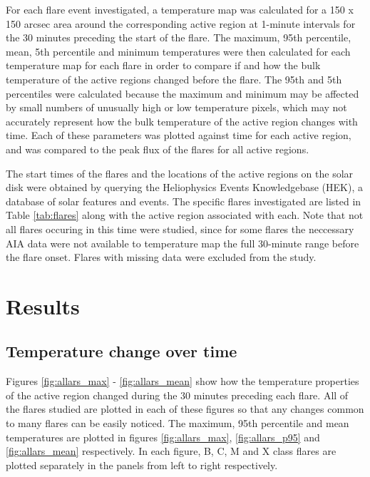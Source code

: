 \documentclass[referee,a4paper,12pt]{swsc}
\begin{document}
\begin{linenumbers}
For each flare event investigated, a temperature map was calculated for a 150 x 150 arcsec area around the corresponding active region at 1-minute intervals for the 30 minutes preceding the start of the flare.
The maximum, 95th percentile, mean, 5th percentile and minimum temperatures were then calculated for each temperature map for each flare in order to compare if and how the bulk temperature of the active regions changed before the flare.
The 95th and 5th percentiles were calculated because the maximum and minimum may be affected by small numbers of unusually high or low temperature pixels, which may not accurately represent how the bulk temperature of the active region changes with time. %
Each of these parameters was plotted against time for each active region, and was compared to the peak flux of the flares for all active regions.

The start times of the flares and the locations of the active regions on the solar disk were obtained by querying the Heliophysics Events Knowledgebase (HEK), a database of solar features and events. %
The specific flares investigated are listed in Table \ref{tab:flares} along with the active region associated with each.
Note that not all flares occuring in this time were studied, since for some flares the neccessary AIA data were not available to temperature map the full 30-minute range before the flare onset.
Flares with missing data were excluded from the study.

\section{Results}
\subsection{Temperature change over time} \label{sec:temps_v_time}
Figures \ref{fig:allars_max} - \ref{fig:allars_mean} show how the temperature properties of the active region changed during the 30 minutes preceding each flare.
All of the flares studied are plotted in each of these figures so that any changes common to many flares can be easily noticed.
The maximum, 95th percentile and mean temperatures are plotted in figures \ref{fig:allars_max}, \ref{fig:allars_p95} and \ref{fig:allars_mean} respectively.
In each figure, B, C, M and X class flares are plotted separately in the panels from left to right respectively.


\end{linenumbers}
\end{document}

